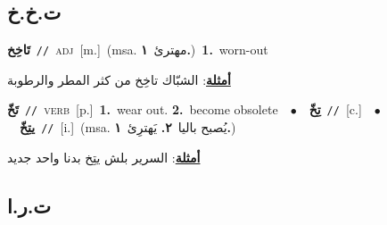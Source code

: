 \documentclass[10pt,a4paper,twoside]{article} %
\begin{document}
\begin{multicols}{2}
\vspace{-3mm}
\subsection*{\color{blue}\foreignlanguage{arabic}{ت.خ.خ}\color{blue}{}} 

{\setlength\topsep{0pt}\textbf{\foreignlanguage{arabic}{تَاخِخ}}\ {\color{gray}\texttt{//}\color{black}}\ \textsc{adj}\ [m.]\ \color{gray}(msa. \foreignlanguage{arabic}{مهترئ}~\foreignlanguage{arabic}{\textbf{١.}})\color{black}\ \textbf{1.}~worn-out\  \begin{flushright}\color{gray}\foreignlanguage{arabic}{\textbf{\underline{\foreignlanguage{arabic}{أمثلة}}}: الشبّاك تاخِخ من كثر المطر والرطوبة}\end{flushright}\color{black}} \vspace{2mm}

{\setlength\topsep{0pt}\textbf{\foreignlanguage{arabic}{تَخّ}}\ {\color{gray}\texttt{//}\color{black}}\ \textsc{verb}\ [p.]\ \textbf{1.}~wear out.  \textbf{2.}~become obsolete\ \ $\bullet$\ \ \setlength\topsep{0pt}\textbf{\foreignlanguage{arabic}{تِخّ}}\ {\color{gray}\texttt{//}\color{black}}\ [c.]\ \ $\bullet$\ \ \setlength\topsep{0pt}\textbf{\foreignlanguage{arabic}{يتِخّ}}\ {\color{gray}\texttt{//}\color{black}}\ [i.]\ \color{gray}(msa. \foreignlanguage{arabic}{يُصبح باليا}~\foreignlanguage{arabic}{\textbf{٢.}}  \foreignlanguage{arabic}{يَهترِئ}~\foreignlanguage{arabic}{\textbf{١.}})\color{black}\  \begin{flushright}\color{gray}\foreignlanguage{arabic}{\textbf{\underline{\foreignlanguage{arabic}{أمثلة}}}: السرير بلش يتِخ بدنا واحد جديد}\end{flushright}\color{black}} \vspace{2mm}

\vspace{-3mm}
\subsection*{\color{blue}\foreignlanguage{arabic}{ت.ر.ا}\color{blue}{ (ntws)}} 


\end{multicols}
\end{document}

